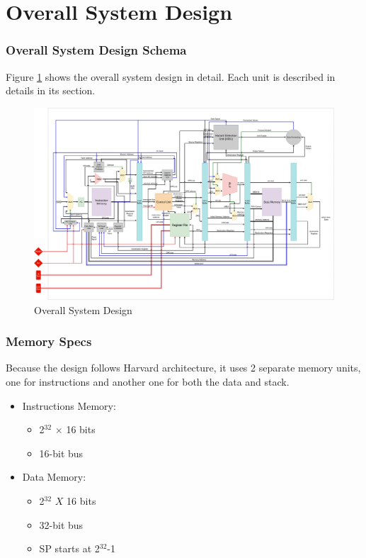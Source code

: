 \documentclass[12pt]{report}
\begin{document}
\part{Overall System Design}
\section{Overall System Design Schema}
Figure \ref{fig:overall} shows the overall system design in detail. Each unit is described in details in its section.
\begin{center}
    \begin{figure}[hp]
        \centering
        \includegraphics[width=\textwidth]{images/overall_system}
        \caption{Overall System Design}
        \label{fig:overall}
    \end{figure}
\end{center}

\section{Memory Specs}
Because the design follows Harvard architecture, it uses 2 separate memory units, one for instructions and another one for both the data and stack.
\begin{itemize}
    \item Instructions Memory:
    \begin{itemize}
        \item 2$^{32}$ $\times$ 16 bits
        \item 16-bit bus
    \end{itemize}
    \item Data Memory:
    \begin{itemize}
        \item 2$^{32}$ $X$ 16 bits
        \item 32-bit bus
        \item SP starts at 2$^{32}$-1
    \end{itemize}
\end{itemize}
\end{document}
